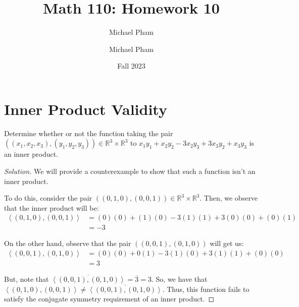 \documentclass{article}
\title{#1}
\author{Michael Pham}
\date{#2}
\newenvironment{solution}{\begin{proof}[Solution]}{\end{proof}}
\newcommand{\RR}{\mathbb{R}}
\newcommand{\innerproduct}[2]{\left\langle{#1}, {#2}\right\rangle}
\newcommand{\mytitle}[2]{%
	\title{#1}
	\author{Michael Pham}
	\date{#2}
	\maketitle
	\newpage
	\tableofcontents
	\newpage
}
\begin{document}
	\mytitle{Math 110: Homework 10}{Fall 2023}
	
	\section{Inner Product Validity}
	\begin{hw}
		Determine whether or not the function taking the pair $( (x_{1}, x_{2}, x_{3}), (y_{1}, y_{2}, y_{3})) \in \RR^{3} \times \RR^{3}$ to $x_{1}y_{1} + x_{2}y_{2} - 3x_{2}y_{3} + 3x_{3}y_{2} + x_{3}y_{3}$ is an inner product.
	\end{hw}
	\begin{solution}
		We will provide a counterexample to show that such a function isn't an inner product.
		
		To do this, consider the pair $((0,1,0), (0,0,1)) \in \RR^{3} \times \RR^{3}$. Then, we observe that the inner product will be:
		\begin{align*}
			\innerproduct{(0,1,0)}{(0,0,1)} &= (0)(0) + (1)(0) - 3(1)(1) + 3(0)(0) + (0)(1) \\
			&= -3
		\end{align*}
	
		On the other hand, observe that the pair $( (0,0,1), (0,1,0))$ will get us:
		\begin{align*}
			\innerproduct{(0,0,1)}{(0,1,0)} &= (0)(0) + 0(1) - 3(1)(0) + 3(1)(1) + (0)(0) \\
			&= 3
		\end{align*}
	
		But, note that $\overline{\innerproduct{(0,0,1)}{(0,1,0)}} = \overline{3} = 3$. So, we have that $\innerproduct{(0,1,0)}{(0,0,1)} \neq \overline{\innerproduct{(0,0,1)}{(0,1,0)}}$. Thus, this function fails to satisfy the conjugate symmetry requirement of an inner product.
	\end{solution}

	\newpage
	
\end{document}
